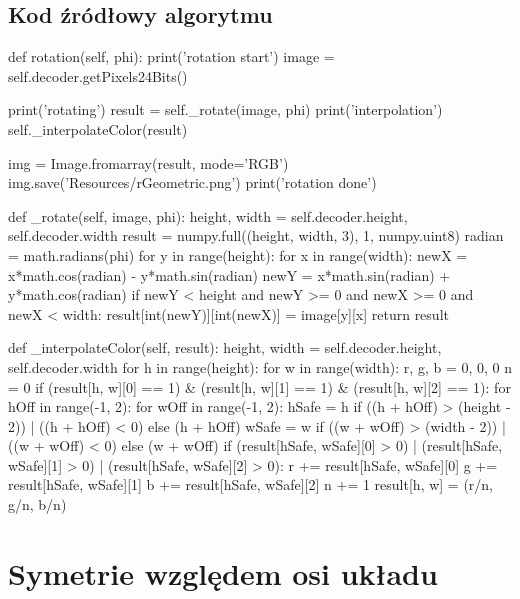 \documentclass[a4paper,12pt]{book}
\begin{document}
\subsection*{Kod źródłowy algorytmu}
\begin{python}
def rotation(self, phi):
	print('rotation start')
	image = self.decoder.getPixels24Bits()
	
	print('rotating')
	result = self._rotate(image, phi)
	print('interpolation')
	self._interpolateColor(result)
	
	img = Image.fromarray(result, mode='RGB')
	img.save('Resources/rGeometric.png')
	print('rotation done')

def _rotate(self, image, phi):
	height, width = self.decoder.height, self.decoder.width
	result = numpy.full((height, width, 3), 1, numpy.uint8)
	radian = math.radians(phi)
	for y in range(height):
		for x in range(width): 
			newX = x*math.cos(radian) - y*math.sin(radian)
			newY = x*math.sin(radian) + y*math.cos(radian)
			if newY < height and newY >= 0 and newX >= 0 and newX < width:
				result[int(newY)][int(newX)] = image[y][x]
	return result

def _interpolateColor(self, result):
	height, width = self.decoder.height, self.decoder.width
	for h in range(height):
		for w in range(width):
			r, g, b = 0, 0, 0
			n = 0
			if (result[h, w][0] == 1) & (result[h, w][1] == 1) & (result[h, w][2] == 1):
				for hOff in range(-1, 2):
					for wOff in range(-1, 2):
						hSafe = h if ((h + hOff) > (height - 2)) | ((h + hOff) < 0) else (h + hOff)
						wSafe = w if ((w + wOff) > (width - 2)) | ((w + wOff) < 0) else (w + wOff)
						if (result[hSafe, wSafe][0] > 0) | (result[hSafe, wSafe][1] > 0) | (result[hSafe, wSafe][2] > 0):
							r += result[hSafe, wSafe][0]
							g += result[hSafe, wSafe][1]
							b += result[hSafe, wSafe][2]
							n += 1
				result[h, w] = (r/n, g/n, b/n)
\end{python}
\section{Symetrie względem osi układu}
\end{document}
